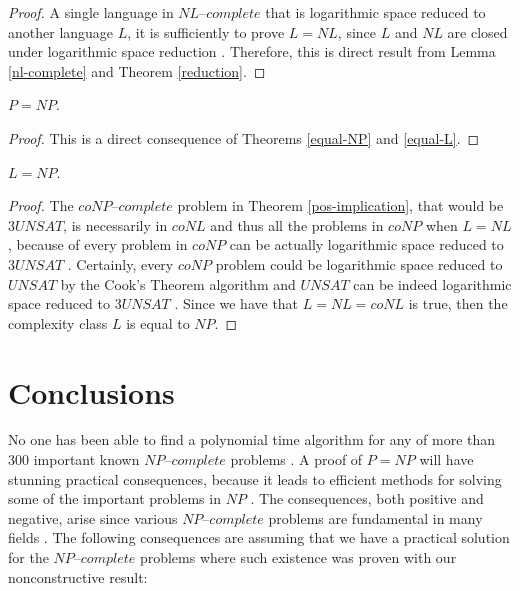 \documentclass[a4paper,UKenglish,cleveref, autoref]{lipics-v2019}
\begin{document}
\begin{proof}
A single language in $\textit{NL--complete}$ that is logarithmic space reduced to another language $L$, it is sufficiently to prove $L = NL$, since $L$ and $NL$ are closed under logarithmic space reduction \cite{Pap03}. Therefore, this is direct result from Lemma \ref{nl-complete} and Theorem \ref{reduction}.
\end{proof}

\begin{theorem}
$P = NP$.
\end{theorem}

\begin{proof}
This is a direct consequence of Theorems \ref{equal-NP} and \ref{equal-L}.
\end{proof}

\begin{theorem}
$L = NP$.
\end{theorem}

\begin{proof}
The $\textit{coNP--complete}$ problem in Theorem \ref{pos-implication}, that would be $3UNSAT$, is necessarily in $coNL$ and thus all the problems in $coNP$ when $L = NL$, because of every problem in $coNP$ can be actually logarithmic space reduced to $3UNSAT$ \cite{GJ79}. Certainly, every $coNP$ problem could be logarithmic space reduced to $UNSAT$ by the Cook's Theorem algorithm and $UNSAT$ can be indeed logarithmic space reduced to $3UNSAT$ \cite{GJ79}. Since we have that $L = NL = coNL$ is true, then the complexity class $L$ is equal to $NP$.
\end{proof}

\section{Conclusions}

No one has been able to find a polynomial time algorithm for any of more than $300$ important known $\textit{NP--complete}$ problems \cite{GJ79}. A proof of $P = NP$ will have stunning practical consequences, because it leads to efficient methods for solving some of the important problems in $NP$ \cite{CS00}. The consequences, both positive and negative, arise since various $\textit{NP--complete}$ problems are fundamental in many fields \cite{CS00}. The following consequences are assuming that we have a practical solution for the $\textit{NP--complete}$ problems where such existence was proven with our nonconstructive result:
\end{document}
